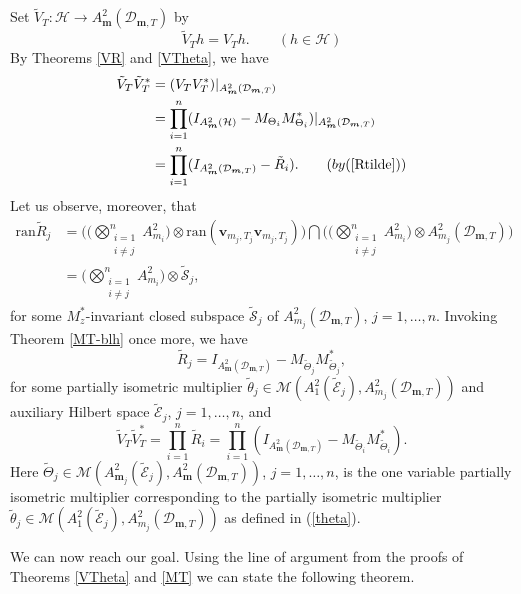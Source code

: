 \documentclass[12pt]{amsart}
\begin{document}
{\noindent} Set $\tilde{V}_T : {\mathcal{H}} {\rightarrow} A^2_{\bm{m}}({\mathcal{D}_{\bm{m},T}})$ by \[\tilde{V}_T h
= V_T h. \quad \quad (h \in {\mathcal{H}})\]By Theorems \ref{VR} and
\ref{VTheta}, we have \[\begin{split} \tilde{V}_T \tilde{V}_T^* & =
(V_T V_T^*)|_{A^2_{\bm{m}}({\mathcal{D}_{\bm{m},T}})} \\ & = \prod_{i=1}^n
(I_{A^2_{\bm{m}}({\mathcal{H}})} - M_{\Theta_i} M_{\Theta_i}^*)|_{A^2_{\bm{m}}({\mathcal{D}_{\bm{m},T}})}
\\& = \prod_{i=1}^n (I_{A^2_{\bm{m}}({\mathcal{D}}_{{\bm{m}}, T})} - \tilde{R}_i). \quad \quad
(by (\ref{Rtilde}))\end{split}\]Let us observe, moreover, that
\[\begin{split}\mbox{ran} \tilde{R}_j  & = \Big(\Big( \bigotimes_{\substack{{i=1}\\i \neq
j}}^n A^2_{m_i} \Big) \otimes \mbox{ran} ({\bm{v}}_{m_j, T_j} {\bm{v}}_{m_j,
T_j})\Big) \bigcap \Big(\Big( \bigotimes_{\substack{{i=1}\\i \neq
j}}^n A^2_{m_i} \Big) \otimes A^2_{m_j}({\mathcal{D}}_{{\bm{m}}, T})\Big)\\ & =
\Big( \bigotimes_{\substack{{i=1}\\i \neq j}}^n A^2_{m_i} \Big)
\otimes \tilde{\mathcal{S}}_j,
\end{split}\]for some $M_z^*$-invariant closed subspace $\tilde{\mathcal{S}}_j$ of
$A^2_{m_j}({\mathcal{D}}_{{\bm{m}}, T})$, $j = 1, \ldots, n$. Invoking Theorem
\ref{MT-blh} once more, we have \[\tilde{R}_j = I_{A^2_{\bm{m}}({\mathcal{D}}_{{\bm{m}},
T})} - M_{\tilde{\Theta}_j} M_{\tilde{\Theta}_j}^*,\]for some
partially isometric multiplier $\tilde{\theta}_j \in
{\mathcal{M}}(A^2_1(\tilde{\mathcal{E}}_j), A^2_{m_j}({\mathcal{D}}_{{\bm{m}}, T}))$ and auxiliary
Hilbert space $\tilde{\mathcal{E}}_j$, $j = 1, \ldots, n$, and
\[\tilde{V}_T \tilde{V}_T^* = \prod_{i=1}^n \tilde{R}_i =
\prod_{i=1}^n (I_{A^2_{\bm{m}}({\mathcal{D}}_{{\bm{m}}, T})} - M_{\tilde{\Theta}_i}
M_{\tilde{\Theta}_i}^*).\] Here $\tilde{\Theta}_j \in
{\mathcal{M}}(A^2_{{\bm{m}}_j}(\tilde{\mathcal{E}}_j), A^2_{\bm{m}}({\mathcal{D}}_{{\bm{m}}, T}))$, $j = 1,
\ldots, n$, is the one variable partially isometric multiplier
corresponding to the partially isometric multiplier
$\tilde{\theta}_j \in {\mathcal{M}}(A^2_1(\tilde{\mathcal{E}}_j),
A^2_{m_j}({\mathcal{D}}_{{\bm{m}}, T}))$ as defined in (\ref{theta}).

We can now reach our goal. Using the line of argument from the
proofs of Theorems \ref{VTheta} and \ref{MT} we can state the
following theorem.
\end{document}
